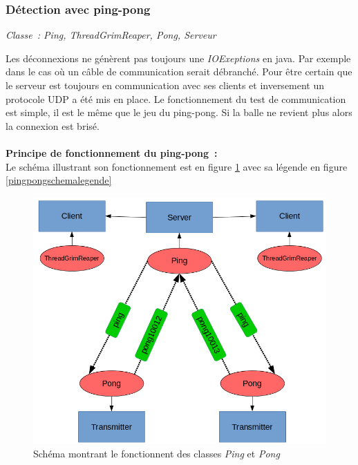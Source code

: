 \documentclass[a4paper, titlepage]{livret}
\begin{document}
    \subsubsection{Détection avec ping-pong}
    \begin{center}
    \textit{Classe : Ping, ThreadGrimReaper, Pong, Serveur}
    \end{center}
      Les déconnexions ne génèrent pas toujours une \textit{IOExeptions} en java. Par exemple dans le cas où un câble de communication serait débranché. Pour être certain que le serveur est toujours en communication avec ses clients et inversement un protocole UDP a été mis en place. Le fonctionnement du test de communication est simple, il est le même que le jeu du ping-pong. Si la balle ne revient plus alors la connexion est brisé.
\\
\\
\textbf{Principe de fonctionnement du ping-pong :}
\\
Le schéma illustrant son fonctionnement est en figure \ref{pingpongschema} avec sa légende en figure \ref{pingpongschemalegende}
\begin{figure}[th]
      \begin{center}
        \includegraphics[scale=0.5]{Assets/s_r_3.png}
        \caption{Schéma montrant le fonctionnent des classes \textit{Ping} et \textit{Pong}}
        \label{pingpongschema}
      \end{center}
\end{figure}
\end{document}
